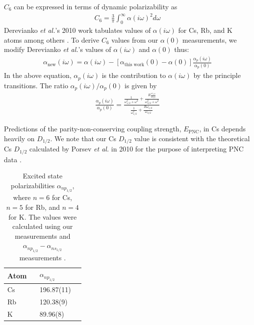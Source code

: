 \documentclass[twocolumn,prl,showpacs,superscriptaddress]{revtex4-1}   %
\newcommand{\sspace}{$\enspace$}
\newcommand{\etal}{\textit{et al.}}
\newcommand{\etalspace}{\textit{et al. }}
\begin{document}
$C_6$ can be expressed in terms of dynamic polarizability as
\begin{align}
	C_6 = \frac{3}{\pi} \int_0^{\infty} \alpha(i\omega)^2 d\omega
	\label{C6fromPol}
\end{align}
Derevianko \etal's 2010 work tabulates values of $\alpha(i\omega)$ for Cs, Rb, and K atoms among others \cite{Derevianko2010}. To derive $C_6$ values from our $\alpha(0)$ measurements, we modify Derevianko \etal's values of $\alpha(i\omega)$ and $\alpha(0)$ thus:
\begin{align}
	\alpha_{\mathrm{new}}(i\omega) = 
	\alpha(i\omega) - 
	\left[\alpha_{\textrm{this work}}(0) - \alpha(0)\right]
	\frac{\alpha_p(i\omega)}{\alpha_p(0)}
	\label{alphaNew}
\end{align}
In the above equation, $\alpha_p(i\omega)$ is the contribution to $\alpha(i\omega)$ by the principle transitions. The ratio $\alpha_p(i\omega)/\alpha_p(0)$ is given by
\begin{align}
	\frac{\alpha_p(i\omega)}{\alpha_p(0)} = \frac
	{
		\frac{1}{\omega_{1/2}^2+\omega^2} + \frac{R\frac{\omega_{1/2}}{\omega_{3/2}}}{\omega_{3/2}^2+\omega^2}
	}
	{
		\frac{1}{\omega_{1/2}^2} + \frac{R\omega_{1/2}}{\omega_{3/2}}
	}
	\label{polPRatio}
\end{align}

Predictions of the parity-non-conserving coupling strength, $E_{\mathrm{PNC}}$, in Cs depends heavily on $D_{1/2}$.
We note that our Cs $D_{1/2}$ value is consistent with the theoretical Cs $D_{1/2}$ calculated by Porsev \etalspace in 2010 for the purpose of interpreting PNC data \cite{Porsev2010}.

\begingroup
\begin{table}
\caption{\label{tablePolExcited}Excited state polarizabilities $\alpha_{np_{1/2}}$, where $n = 6$ for Cs, $n = 5$ for Rb, and $n = 4$ for K. The values were calculated using our measurements and $\alpha_{np_{1/2}} - \alpha_{ns_{1/2}}$ measurements \cite{Hunter1991,Miller1994}.}
\begin{center}
\begin{tabular}{l l l}
\hline\hline
Atom \sspace & $\alpha_{np_{1/2}}$ \\
\hline
Cs & 196.87(11) \\
Rb & 120.38(9) \\
K  & 89.96(8) \\
\hline\hline
\end{tabular}
\end{center}
\end{table}
\endgroup
\end{document}
